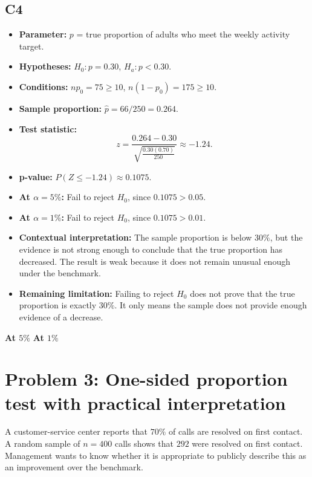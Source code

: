 	\subsection*{C4}
	\begin{itemize}
		\item \textbf{Parameter:} \(p\) = true proportion of adults who meet the weekly activity target.
		\item \textbf{Hypotheses:} \(H_0:p=0.30\), \(H_a:p<0.30\).
		\item \textbf{Conditions:} \(np_0=75\ge10\), \(n(1-p_0)=175\ge10\).
		\item \textbf{Sample proportion:} \(\hat p=66/250=0.264\).
		\item \textbf{Test statistic:}
		\[
		z=\frac{0.264-0.30}{\sqrt{\frac{0.30(0.70)}{250}}}\approx -1.24.
		\]
		\item \textbf{p-value:} \(P(Z\le-1.24)\approx0.1075\).
		\item \textbf{At \(\alpha=5\%\):} Fail to reject \(H_0\), since \(0.1075>0.05\).
		\item \textbf{At \(\alpha=1\%\):} Fail to reject \(H_0\), since \(0.1075>0.01\).
		\item \textbf{Contextual interpretation:} The sample proportion is below \(30\%\), but the evidence is not strong enough to conclude that the true proportion has decreased. The result is weak because it does not remain unusual enough under the benchmark.
		\item \textbf{Remaining limitation:} Failing to reject \(H_0\) does not prove that the true proportion is exactly \(30\%\). It only means the sample does not provide enough evidence of a decrease.
	\end{itemize}
	
	\begin{center}
		\textbf{At \(5\%\)}\;
		\hspace{0.8cm}
		\textbf{At \(1\%\)}\;
	\end{center}
	
	\section{Problem 3: One-sided proportion test with practical interpretation}
	A customer-service center reports that \(70\%\) of calls are resolved on first contact. A random sample of \(n=400\) calls shows that \(292\) were resolved on first contact. Management wants to know whether it is appropriate to publicly describe this as an improvement over the benchmark.
	

